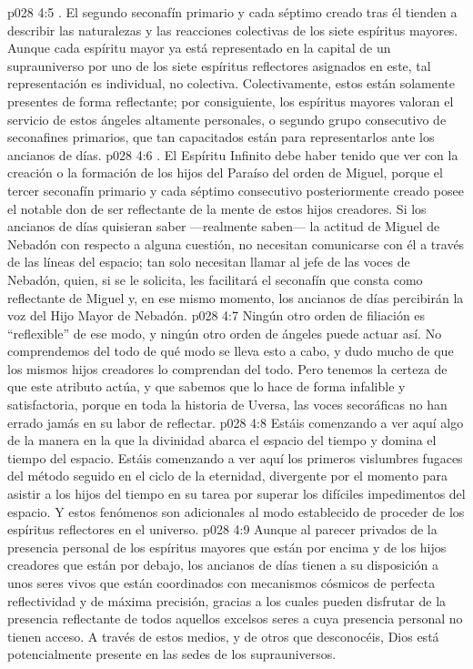 \vs p028 4:5 . El segundo seconafín primario y cada séptimo creado tras él tienden a describir las naturalezas y las reacciones colectivas de los siete espíritus mayores. Aunque cada espíritu mayor ya está representado en la capital de un suprauniverso por uno de los siete espíritus reflectores asignados en este, tal representación es individual, no colectiva. Colectivamente, estos están solamente presentes de forma reflectante; por consiguiente, los espíritus mayores valoran el servicio de estos ángeles altamente personales, o segundo grupo consecutivo de seconafines primarios, que tan capacitados están para representarlos ante los ancianos de días.
\vs p028 4:6 . El Espíritu Infinito debe haber tenido que ver con la creación o la formación de los hijos del Paraíso del orden de Miguel, porque el tercer seconafín primario y cada séptimo consecutivo posteriormente creado posee el notable don de ser reflectante de la mente de estos hijos creadores. Si los ancianos de días quisieran saber ---realmente saben--- la actitud de Miguel de Nebadón con respecto a alguna cuestión, no necesitan comunicarse con él a través de las líneas del espacio; tan solo necesitan llamar al jefe de las voces de Nebadón, quien, si se le solicita, les facilitará el seconafín que consta como reflectante de Miguel y, en ese mismo momento, los ancianos de días percibirán la voz del Hijo Mayor de Nebadón.
\vs p028 4:7 Ningún otro orden de filiación es “reflexible” de ese modo, y ningún otro orden de ángeles puede actuar así. No comprendemos del todo de qué modo se lleva esto a cabo, y dudo mucho de que los mismos hijos creadores lo comprendan del todo. Pero tenemos la certeza de que este atributo actúa, y que sabemos que lo hace de forma infalible y satisfactoria, porque en toda la historia de Uversa, las voces secoráficas no han errado jamás en su labor de reflectar.
\vs p028 4:8 Estáis comenzando a ver aquí algo de la manera en la que la divinidad abarca el espacio del tiempo y domina el tiempo del espacio. Estáis comenzando a ver aquí los primeros vislumbres fugaces del método seguido en el ciclo de la eternidad, divergente por el momento para asistir a los hijos del tiempo en su tarea por superar los difíciles impedimentos del espacio. Y estos fenómenos son adicionales al modo establecido de proceder de los espíritus reflectores en el universo.
\vs p028 4:9 Aunque al parecer privados de la presencia personal de los espíritus mayores que están por encima y de los hijos creadores que están por debajo, los ancianos de días tienen a su disposición a unos seres vivos que están coordinados con mecanismos cósmicos de perfecta reflectividad y de máxima precisión, gracias a los cuales pueden disfrutar de la presencia reflectante de todos aquellos excelsos seres a cuya presencia personal no tienen acceso. A través de estos medios, y de otros que desconocéis, Dios está potencialmente presente en las sedes de los suprauniversos.
